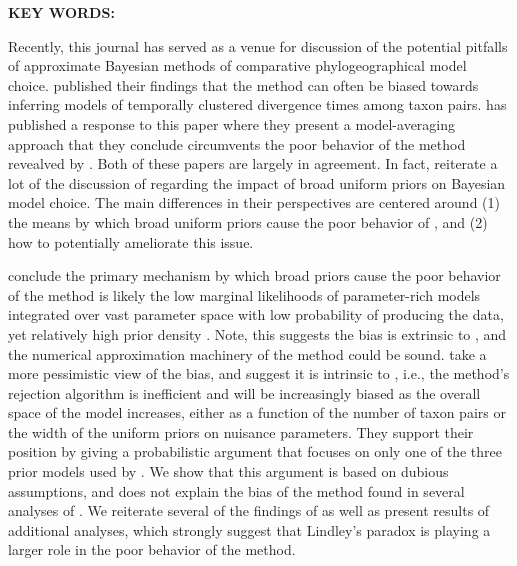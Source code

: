 \documentclass[letterpaper,12pt]{article}
\begin{document}
\begin{linenumbers}
{    \vspace{12pt}
    \noindent\textbf{KEY WORDS: } 
}

\newpage
\noindent Recently, this journal has served as a venue for discussion of the
potential pitfalls of approximate Bayesian methods of comparative
phylogeographical model choice.
\citet{Oaks2012} published their findings that the method \msb can often be
biased towards inferring models of temporally clustered divergence times
among taxon pairs.
\citet{Hickerson2013} has published a response to this paper where they
present a model-averaging approach that they conclude circumvents the poor
behavior of the method revealved by \citet{Oaks2012}.
Both of these papers are largely in agreement.
In fact, \citet{Hickerson2013} reiterate a lot of the discussion of
\citet{Oaks2012} regarding the impact of broad uniform priors on Bayesian model
choice.
The main differences in their perspectives are centered around
(1) the means by which broad uniform priors cause the poor behavior of \msb,
and
(2) how to potentially ameliorate this issue.

\citet{Oaks2012} conclude the primary mechanism by which broad priors cause the
poor behavior of the method is likely the low marginal likelihoods of
parameter-rich models integrated over vast parameter space with low probability
of producing the data, yet relatively high prior density \citep[this is often
referred to as Lindley's paradox;][]{Lindley1957}.
Note, this suggests the bias is extrinsic to \msb, and the numerical
approximation machinery of the method could be sound.
\citet{Hickerson2013} take a more pessimistic view of the bias, and suggest it
is intrinsic to \msb, i.e., the method's rejection algorithm is
inefficient and will be increasingly biased as the overall space of the model
increases, either as a function of the number of taxon pairs or the width of
the uniform priors on nuisance parameters.
They support their position by giving a probabilistic argument that focuses on
only one of the three prior models used by \citet{Oaks2012}.
We show that this argument is based on dubious assumptions, and does not
explain the bias of the method found in several analyses of \citet{Oaks2012}.
We reiterate several of the findings of \citet{Oaks2012} as well as present
results of additional analyses, which strongly suggest that Lindley's paradox
is playing a larger role in the poor behavior of the method.


\end{linenumbers}
\end{document}
